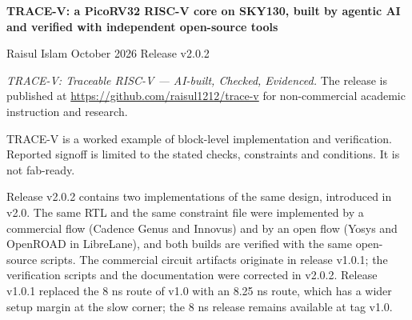 \documentclass[11pt,letterpaper]{article}
\renewcommand{\_}{\textunderscore\penalty0\hskip0pt\relax}
\begin{document}
\begin{center}
{\LARGE\bfseries TRACE-V: a PicoRV32 RISC-V core on SKY130, built by agentic AI and verified with independent open-source tools\par}
\vspace{0.8em}
{Raisul Islam \textperiodcentered{} October 2026 \textperiodcentered{} Release v2.0.2\par}
\end{center}

\textit{TRACE-V: Traceable RISC-V --- AI-built, Checked, Evidenced.} The release is published at \url{https://github.com/raisul1212/trace-v} for non-commercial academic instruction and research.

TRACE-V is a worked example of block-level implementation and verification. Reported signoff is limited to the stated checks, constraints and conditions. It is not fab-ready.

Release v2.0.2 contains two implementations of the same design, introduced in v2.0. The same RTL and the same constraint file were implemented by a commercial flow (Cadence Genus and Innovus) and by an open flow (Yosys and OpenROAD in LibreLane), and both builds are verified with the same open-source scripts. The commercial circuit artifacts originate in release v1.0.1; the verification scripts and the documentation were corrected in v2.0.2. Release v1.0.1 replaced the 8 ns route of v1.0 with an 8.25 ns route, which has a wider setup margin at the slow corner; the 8 ns release remains available at tag v1.0.
\end{document}

